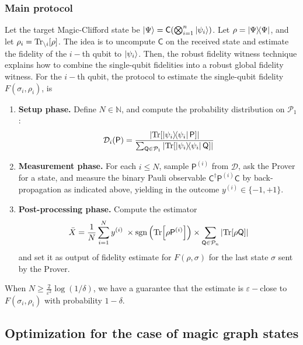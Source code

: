 \documentclass[11pt]{article}
\newcommand{\concept}[1]{\textcolor{importantclr}{\textsf{\textbf{#1}}}}
\renewcommand{\P}{\mathsf{P}}
\newcommand{\Q}{\mathsf{Q}}
\newcommand{\Pauli}{\mathcal{P}}
\newcommand{\C}{\mathsf{C}}
\begin{document}
\subsubsection{Main protocol}
Let the target Magic-Clifford state be $\ket\Psi = \C(\bigotimes_{i=1}^n \ket{\psi_i})$. Let $\rho = \ketbra \Psi$, and let $\rho_i = \Tr_{\backslash i}[\rho]$. The idea is to uncompute $\C$ on the received state and estimate the fidelity of the $i-$th qubit to $\ket{\psi_i}$. Then, the robust fidelity witness technique explains how to combine the single-qubit fidelities into a robust global fidelity witness. For the $i-$th qubit, the protocol to estimate the single-qubit fidelity $F(\sigma_i, \rho_i)$, is
\begin{enumerate}
    \item \concept{Setup phase.} Define $N\in \mathbb N$, and compute the probability distribution on $\Pauli_1$:
        \begin{equation}
            \mathcal D_i(\P) = \dfrac{\abs{\Tr[\ketbra{\psi_i}\P]}}{\sum_{\Q\in\Pauli_1}\abs{\Tr[\ketbra{\psi_i}\Q]}}
        \end{equation}
        \item \concept{Measurement phase.} For each $i\leq N$, sample $\P^{(i)}$ from $\mathcal D$, ask the Prover for a state, and measure the binary Pauli observable $\C^\dagger\P^{(i)}\C$ by back-propagation as indicated above, yielding in the outcome $y^{(i)}\in\{-1, +1\}$.
        \item \concept{Post-processing phase.} Compute the estimator 
        \begin{equation}
            \bar X = \dfrac{1}{N} \sum_{i=1}^N
            y^{(i)}
            \;
            \times
            \mathrm{sgn}\left( 
                \Tr[\rho\P^{(i)}]
             \right)
             \times
             \sum_{\Q\in\Pauli_n}\abs{\Tr[\rho\Q]}
        \end{equation}
        and set it as output of fidelity estimate for $F(\rho, \sigma)$ for the last state $\sigma$ sent by the Prover.
\end{enumerate}
When $N \geq \frac{2}{\varepsilon^{2}}\log(1/\delta)$, we have a guarantee that the estimate is $\varepsilon-$close to $F(\sigma_i, \rho_i)$ with probability $1-\delta$.

\subsection{Optimization for the case of magic graph states}
\end{document}

